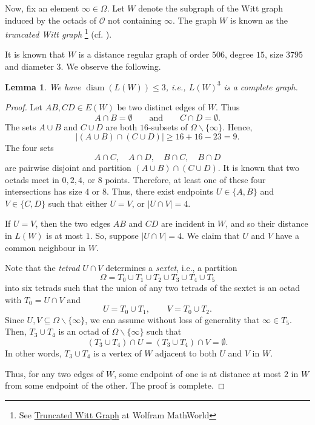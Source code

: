 \documentclass[11pt]{article}
\theoremstyle{plain}
\newtheorem{lemma}[theorem]{Lemma}
\numberwithin{equation}{section}
\DeclareMathOperator{\diam}{diam}
\begin{document}
Now, fix an element $\infty \in \Omega$. Let $W$ denote the subgraph of the Witt graph induced by the octads of $\mathcal{O}$ not containing $\infty$. The graph $W$ is known as the \emph{truncated Witt graph} \footnote{See \href{https://mathworld.wolfram.com/TruncatedWittGraph.html}{Truncated Witt Graph} at Wolfram MathWorld} (cf. \cite{Brouwer_Cohen_Neumaier_1989}).

It is known that $W$ is a distance regular graph of order $506$, degree $15$, size $3795$ and diameter $3$. We observe the following. 

\begin{lemma}\label{lemma:diam_W} We have $\diam(L(W))\le 3$, i.e., $L(W)^3$ is a complete graph.
\end{lemma}

\begin{proof}
Let $AB, CD\in E(W)$ be two distinct edges of $W$.  Thus
\[
        A\cap B=\emptyset
        \qquad\text{and}\qquad
        C\cap D=\emptyset.
\]
The sets $A\cup B$ and $C\cup D$ are both $16$-subsets of
$\Omega\backslash \{\infty\}$. Hence,
\[
|(A\cup B)\cap(C\cup D)|\ge 16+16-23 = 9.
\]
The four sets
\[
        A\cap C,\quad A\cap D,\quad B\cap C,\quad B\cap D
\]
are pairwise disjoint and partition $(A\cup B)\cap(C\cup D)$. It is known that two octads meet in $0,2,4$, or $8$ points. Therefore, at least one of these four
intersections has size $4$ or $8$. Thus, there exist endpoints $U\in\{A,B\}$ and $V\in\{C,D\}$ such that either $U=V$, or $|U\cap V|=4$. 

If $U=V$, then the two edges $AB$ and $CD$ are incident in $W$, and
so their distance in $L(W)$ is at most $1$. So, suppose $|U\cap V|=4$.  We claim that $U$ and $V$ have a common
neighbour in $W$.  

Note that the \emph{tetrad} $U\cap V$ determines a \emph{sextet}, i.e., a partition
\[
        \Omega=T_0\cup T_1\cup T_2\cup T_3\cup T_4\cup T_5
\]
into six tetrads such that the union of any two tetrads
of the sextet is an octad with $T_0=U\cap V$ and
\[
        U=T_0\cup T_1,
        \qquad
        V=T_0\cup T_2.
\]
Since $U,V\subseteq \Omega\backslash \{\infty\}$, we can assume without loss of generality that $\infty\in T_5$. Then, $T_3\cup T_4$ is an octad of $\Omega\backslash \{\infty\}$ such that
\[
        (T_3\cup T_4)\cap U=(T_3\cup T_4)\cap V=\emptyset.
\]
In other words, $T_3\cup T_4$ is a vertex of $W$ adjacent to both $U$ and $V$ in $W$. 

Thus, for any two edges of $W$, some endpoint of one is at distance at most $2$ in $W$ from some endpoint of the other. The proof is complete.
\end{proof}
\end{document}
